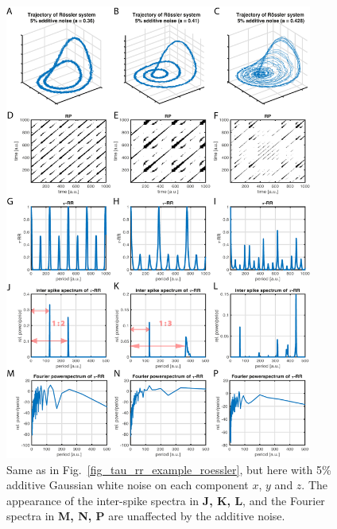 \documentclass[entropy,article,submit,pdftex,moreauthors]{Definitions/mdpi}
\providecommand{\DIFaddbegin}{} %
\begin{document}
\begin{figure}[h!]
 \centering
 \includegraphics[width=0.9\textwidth]{./figures/fig_tau_rr_example_roessler_noise}
 \caption{Same as in Fig.~\ref{fig_tau_rr_example_roessler}, but here with 5\% additive Gaussian white noise on each component $x$, $y$ and $z$. The appearance of the inter-spike spectra 
 in \textbf{J, K, L}, and the Fourier spectra in \textbf{M, N, P} are unaffected by the additive noise.}
\label{fig_tau_rr_example_roessler_noise}
\end{figure}

\clearpage 
\DIFaddbegin 
\end{document}
